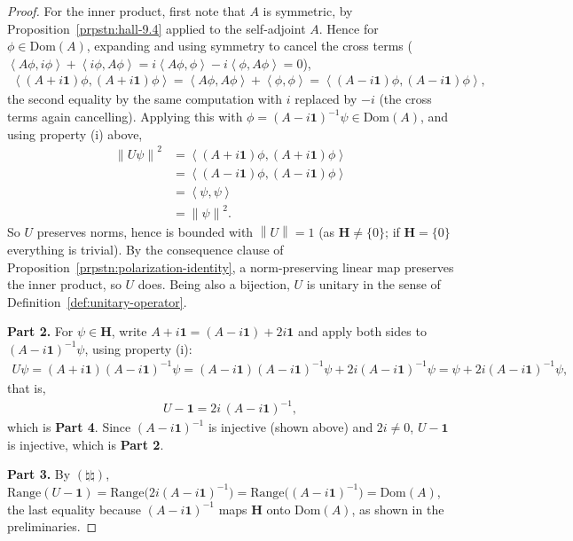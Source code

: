 \begin{proof}
For the inner product, first note that $A$ is symmetric, by Proposition~\ref{prpstn:hall-9.4} applied to the self-adjoint $A$. Hence for $\phi \in \text{Dom}(A)$, expanding and using symmetry to cancel the cross terms ($\left< A\phi, i\phi \right> + \left< i\phi, A\phi \right> = i\left< A\phi,\phi \right> - i\left< \phi, A\phi \right> = 0$),
\begin{align}
    \left< (A+i\mathbf{1})\phi, (A+i\mathbf{1})\phi \right> = \left< A\phi,A\phi \right> + \left< \phi,\phi \right> = \left< (A-i\mathbf{1})\phi, (A-i\mathbf{1})\phi \right>,
\end{align}
the second equality by the same computation with $i$ replaced by $-i$ (the cross terms again cancelling). Applying this with $\phi = (A-i\mathbf{1})^{-1}\psi \in \text{Dom}(A)$, and using property (i) above,
\begin{align}
    \left\| U\psi \right\|^2 &= \left< (A+i\mathbf{1})\phi, (A+i\mathbf{1})\phi \right> \\
                &= \left< (A-i\mathbf{1})\phi, (A-i\mathbf{1})\phi \right> \\
                &= \left< \psi,\psi \right> \\
                &= \left\| \psi \right\|^2.
\end{align}
So $U$ preserves norms, hence is bounded with $\left\| U \right\| = 1$ (as $\mathbf{H} \ne \{0\}$; if $\mathbf{H} = \{0\}$ everything is trivial). By the consequence clause of Proposition~\ref{prpstn:polarization-identity}, a norm-preserving linear map preserves the inner product, so $U$ does. Being also a bijection, $U$ is unitary in the sense of Definition~\ref{def:unitary-operator}.

\textbf{Part 2.} For $\psi \in \mathbf{H}$, write $A + i\mathbf{1} = (A - i\mathbf{1}) + 2i\mathbf{1}$ and apply both sides to $(A-i\mathbf{1})^{-1}\psi$, using property (i):
\begin{align}
    U\psi = (A+i\mathbf{1})(A-i\mathbf{1})^{-1}\psi = (A-i\mathbf{1})(A-i\mathbf{1})^{-1}\psi + 2i(A-i\mathbf{1})^{-1}\psi = \psi + 2i(A-i\mathbf{1})^{-1}\psi,
\end{align}
that is,
\begin{align}
    U - \mathbf{1} = 2i\,(A - i\mathbf{1})^{-1}, \tag{$\natural\natural$}
\end{align}
which is \textbf{Part 4}. Since $(A-i\mathbf{1})^{-1}$ is injective (shown above) and $2i \ne 0$, $U - \mathbf{1}$ is injective, which is \textbf{Part 2}.

\textbf{Part 3.} By $(\natural\natural)$, $\text{Range}(U-\mathbf{1}) = \text{Range}\big( 2i(A-i\mathbf{1})^{-1} \big) = \text{Range}\big( (A-i\mathbf{1})^{-1} \big) = \text{Dom}(A)$, the last equality because $(A-i\mathbf{1})^{-1}$ maps $\mathbf{H}$ onto $\text{Dom}(A)$, as shown in the preliminaries.


\end{proof}
